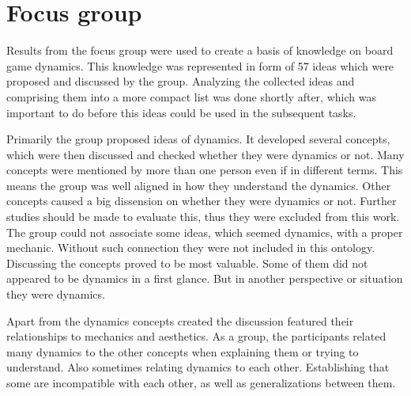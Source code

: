 \section{Focus group} 

Results from the focus group were used to create a basis of knowledge on board game dynamics. This knowledge was represented in form of 57 ideas which were proposed and discussed by the group. Analyzing the collected ideas and comprising them into a more compact list was done shortly after, which was important to do before this ideas could be used in the subsequent tasks. 

Primarily the group proposed ideas of dynamics. It developed several concepts, which were then discussed and checked whether they were dynamics or not. Many concepts were mentioned by more than one person even if in different terms. This means the group was well aligned in how they understand the dynamics. Other concepts caused a big dissension on whether they were dynamics or not. Further studies should be made to evaluate this, thus they were excluded from this work. The group could not associate some ideas, which seemed dynamics, with a proper mechanic. Without such connection they were not included in this ontology. Discussing the concepts proved to be most valuable. Some of them did not appeared to be dynamics in a first glance. But in another perspective or situation they were dynamics.

Apart from the dynamics concepts created the discussion featured their relationships to mechanics and aesthetics. As a group, the participants related many dynamics to the other concepts when explaining them or trying to understand. Also sometimes relating dynamics to each other. Establishing that some are incompatible with each other, as well as generalizations between them.

